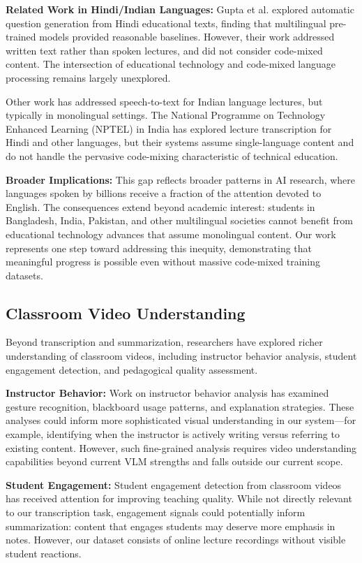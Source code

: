 \textbf{Related Work in Hindi/Indian Languages:} Gupta et al. \cite{Gupta2020} explored automatic question generation from Hindi educational texts, finding that multilingual pre-trained models provided reasonable baselines. However, their work addressed written text rather than spoken lectures, and did not consider code-mixed content. The intersection of educational technology and code-mixed language processing remains largely unexplored.

Other work has addressed speech-to-text for Indian language lectures, but typically in monolingual settings. The National Programme on Technology Enhanced Learning (NPTEL) in India has explored lecture transcription for Hindi and other languages, but their systems assume single-language content and do not handle the pervasive code-mixing characteristic of technical education.

\textbf{Broader Implications:} This gap reflects broader patterns in AI research, where languages spoken by billions receive a fraction of the attention devoted to English. The consequences extend beyond academic interest: students in Bangladesh, India, Pakistan, and other multilingual societies cannot benefit from educational technology advances that assume monolingual content. Our work represents one step toward addressing this inequity, demonstrating that meaningful progress is possible even without massive code-mixed training datasets.

\subsection{Classroom Video Understanding}

Beyond transcription and summarization, researchers have explored richer understanding of classroom videos, including instructor behavior analysis, student engagement detection, and pedagogical quality assessment.

\textbf{Instructor Behavior:} Work on instructor behavior analysis has examined gesture recognition, blackboard usage patterns, and explanation strategies. These analyses could inform more sophisticated visual understanding in our system---for example, identifying when the instructor is actively writing versus referring to existing content. However, such fine-grained analysis requires video understanding capabilities beyond current VLM strengths and falls outside our current scope.

\textbf{Student Engagement:} Student engagement detection from classroom videos has received attention for improving teaching quality. While not directly relevant to our transcription task, engagement signals could potentially inform summarization: content that engages students may deserve more emphasis in notes. However, our dataset consists of online lecture recordings without visible student reactions.


